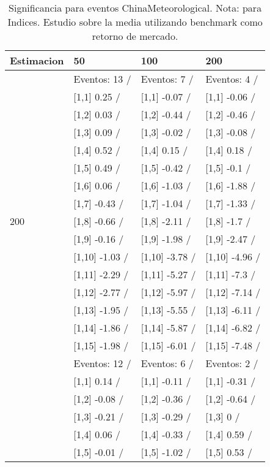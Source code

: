 \begin{table}

\caption{Significancia para eventos ChinaMeteorological. Nota: para Indices. Estudio sobre la media utilizando benchmark como retorno de mercado.}
\centering
\begin{tabular}[t]{llll}
\toprule
Estimacion & 50 & 100 & 200\\
\midrule
 & Eventos:  13 / & Eventos:  7 / & Eventos:  4 /\\
 & {}[1,1] 0.25  / & {}[1,1] -0.07  / & {}[1,1] -0.06  /\\
 & {}[1,2] 0.03  / & {}[1,2] -0.44  / & {}[1,2] -0.46  /\\
 & {}[1,3] 0.09  / & {}[1,3] -0.02  / & {}[1,3] -0.08  /\\
 & {}[1,4] 0.52  / & {}[1,4] 0.15  / & {}[1,4] 0.18  /\\
\addlinespace
 & {}[1,5] 0.49  / & {}[1,5] -0.42  / & {}[1,5] -0.1  /\\
 & {}[1,6] 0.06  / & {}[1,6] -1.03  / & {}[1,6] -1.88  /\\
 & {}[1,7] -0.43  / & {}[1,7] -1.04  / & {}[1,7] -1.33  /\\
200 & {}[1,8] -0.66  / & {}[1,8] -2.11  / & {}[1,8] -1.7  /\\
 & {}[1,9] -0.16  / & {}[1,9] -1.98  / & {}[1,9] -2.47  /\\
\addlinespace
 & {}[1,10] -1.03  / & {}[1,10] -3.78  / & {}[1,10] -4.96  /\\
 & {}[1,11] -2.29  / & {}[1,11] -5.27  / & {}[1,11] -7.3  /\\
 & {}[1,12] -2.77  / & {}[1,12] -5.97  / & {}[1,12] -7.14  /\\
 & {}[1,13] -1.95  / & {}[1,13] -5.55  / & {}[1,13] -6.11  /\\
 & {}[1,14] -1.86  / & {}[1,14] -5.87  / & {}[1,14] -6.82  /\\
\addlinespace
 & {}[1,15] -1.98  / & {}[1,15] -6.01  / & {}[1,15] -7.48  /\\
 & Eventos:  12 / & Eventos:  6 / & Eventos:  2 /\\
 & {}[1,1] 0.14  / & {}[1,1] -0.11  / & {}[1,1] -0.31  /\\
 & {}[1,2] -0.08  / & {}[1,2] -0.36  / & {}[1,2] -0.64  /\\
 & {}[1,3] -0.21  / & {}[1,3] -0.29  / & {}[1,3] 0  /\\
\addlinespace
 & {}[1,4] 0.06  / & {}[1,4] -0.33  / & {}[1,4] 0.59  /\\
 & {}[1,5] -0.01  / & {}[1,5] -1.02  / & {}[1,5] 0.53  /\\

\end{tabular}
\end{table}
